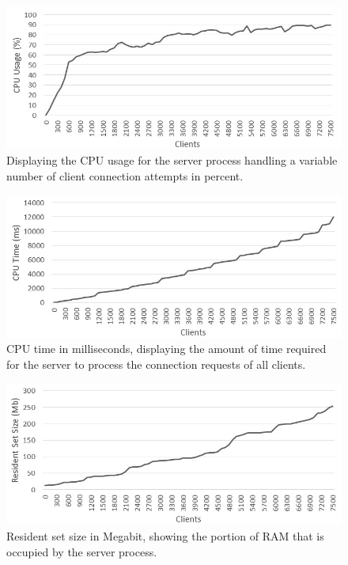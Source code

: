 \documentclass[bsc,frontabs,twoside,singlespacing,parskip,deptreport]{infthesis}     %
\begin{document}
\begin{figure}[H]
\centering
\includegraphics[scale=0.5]{images/test_CLIENT_CPUusage.jpg}
\caption{Displaying the CPU usage for the server process handling a variable number of client connection attempts in percent.}
\label{fig:cpu_usage}
\vspace{1em}
\end{figure}

\begin{figure}[H]
\centering
\includegraphics[scale=0.5]{images/test_CLIENT_CPUtime.jpg}
\caption{CPU time in milliseconds, displaying the amount of time required for the server to process the connection requests of all clients.}
\label{fig:cpu_time}
\end{figure}

\begin{figure}[H]
\centering
\includegraphics[scale=0.5]{images/test_CLIENT_RSS.jpg}
\caption{Resident set size in Megabit, showing the portion of RAM that is occupied by the server process.}
\label{fig:cpu_rss}
\end{figure}
\end{document}
